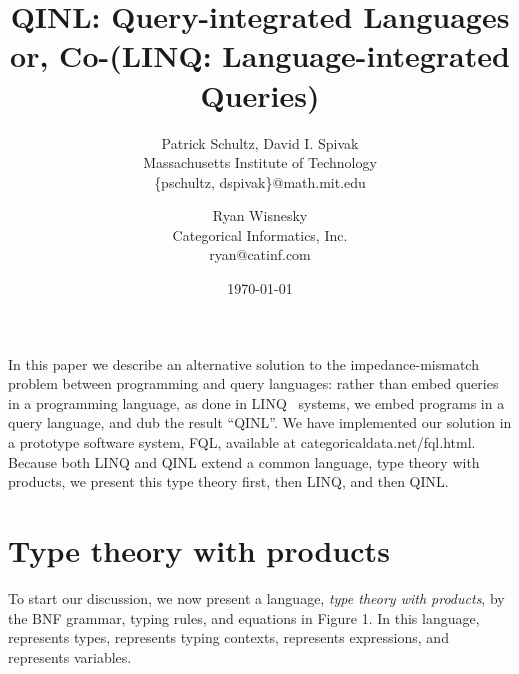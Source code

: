 \documentclass[11pt]{article}
\theoremstyle{remark}
\theoremstyle{definition}
\begin{document}
\title{QINL: Query-integrated Languages \\
{\large or, Co-(LINQ: Language-integrated Queries)}}
\author{Patrick Schultz, David I. Spivak
\\ Massachusetts Institute of Technology \\ {\sf \{pschultz, dspivak\}@math.mit.edu} 
\and
Ryan Wisnesky
\\
Categorical Informatics, Inc.
 \\ {\sf ryan@catinf.com}
}

\date{\today}

\maketitle




\vspace*{-.2in}
In this paper we describe an alternative solution to the impedance-mismatch problem between programming and query languages: rather than embed queries in a programming language, as done in LINQ~\cite{Tannen:1992:NEQ:645500.655920} systems, we embed programs  in a query language, and dub the result ``QINL''.  We have implemented our solution in a prototype software system, FQL, available at {\sf categoricaldata.net/fql.html}.  Because both LINQ and QINL extend a common language, type theory with products, we present this type theory first, then LINQ, and then QINL.

\section{Type theory with products}

To start our discussion, we now present a language, {\it type theory with products}, by the BNF grammar, typing rules, and equations in Figure 1.  In this language,  represents types,  represents typing contexts,  represents expressions, and  represents variables.  
\end{document}
